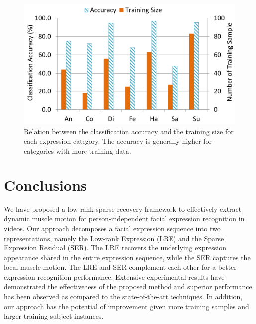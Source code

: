 \documentclass[journal]{IEEEtran}
\begin{document}
\begin{figure}[htbp]
	\centering
		\includegraphics[width=.8\columnwidth]{pics/fig_ck_size.png}
	\caption{Relation between the classification accuracy and the training size for each expression category. The accuracy is generally higher for categories with more training data.}
	\label{fig:fig_ck_size}
\end{figure}



\section{Conclusions\label{sec:conclude}}
We have proposed a low-rank sparse recovery framework to effectively extract dynamic muscle motion for person-independent facial expression recognition in videos. Our approach decomposes a facial expression sequence into two representations, namely the Low-rank Expression (LRE) and the Sparse Expression Residual (SER). The LRE recovers the underlying expression appearance shared in the entire expression sequence, while the SER captures the local muscle motion. The LRE and SER complement each other for a better expression recognition performance. Extensive experimental results have demonstrated the effectiveness of the proposed method and superior performance has been observed as compared to the state-of-the-art techniques. In addition, our approach has the potential of improvement given more training samples and larger training subject instances. 


\ifCLASSOPTIONcaptionsoff
  \newpage
\fi









\end{document}
